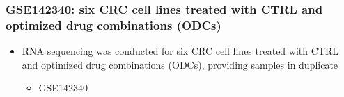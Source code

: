\documentclass[
]{article}
\providecommand{\tightlist}{%
  \setlength{\itemsep}{0pt}\setlength{\parskip}{0pt}}
\begin{document}
\hypertarget{gse142340-six-crc-cell-lines-treated-with-ctrl-and-optimized-drug-combinations-odcs}{%
\subsubsection{GSE142340: six CRC cell lines treated with CTRL and optimized drug combinations (ODCs)}\label{gse142340-six-crc-cell-lines-treated-with-ctrl-and-optimized-drug-combinations-odcs}}

\begin{itemize}
\tightlist
\item
  RNA sequencing was conducted for six CRC cell lines treated with CTRL and optimized drug combinations (ODCs), providing samples in duplicate

  \begin{itemize}
  \tightlist
  \item
    GSE142340
  \end{itemize}
\end{itemize}
\end{document}
